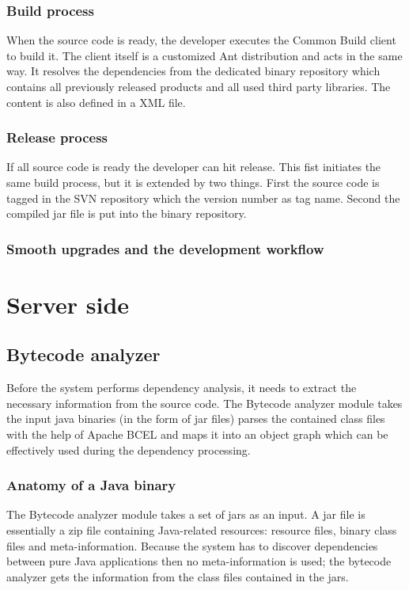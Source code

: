 \subsubsection{Build process}
When the source code is ready, the developer executes the Common Build client to
build it. The client itself is a customized Ant distribution and acts in the
same way. It resolves the dependencies from the dedicated binary repository
which contains all previously released products and all used third party
libraries. The content is also defined in a XML file.

\subsubsection{Release process}
If all source code is ready the developer can hit release. This fist initiates
the same build process, but it is extended by two things. First the source code
is tagged in the SVN repository which the version number as tag name. Second the
compiled jar file is put into the binary repository. 

\subsubsection{Smooth upgrades and the development workflow}


\section{Server side}


\subsection{Bytecode analyzer}
Before the system performs dependency analysis, it needs to extract the
necessary information from the source code.
The Bytecode analyzer module takes the input java binaries (in the form of jar
files) parses the contained class files with the help of Apache BCEL and maps it
into an object graph which can be effectively used during the dependency
processing.


\subsubsection{Anatomy of a Java binary}
The Bytecode analyzer module takes a set of jars as an input. A jar file is
essentially a zip file containing Java-related resources: resource files, binary
class files and meta-information. Because the system has to discover
dependencies between pure Java applications then no meta-information is used;
the bytecode analyzer gets the information from the class files contained in the
jars.
 

